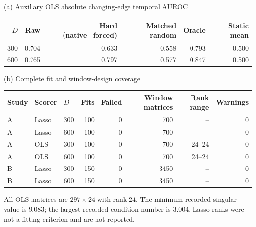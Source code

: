 \begin{minipage}{\linewidth}
\centering\small
(a) Auxiliary OLS absolute changing-edge temporal AUROC\par\medskip
\begin{tabular}{rrrrrr}
\toprule
$D$ & Raw & Hard (native=forced) & Matched random & Oracle & Static mean \\
\midrule
300 & 0.704 & 0.633 & 0.558 & 0.793 & 0.500 \\
600 & 0.765 & 0.797 & 0.577 & 0.847 & 0.500 \\
\bottomrule
\end{tabular}
\par\bigskip
(b) Complete fit and window-design coverage\par\medskip
\begin{tabular}{lllrrrrr}
\toprule
Study & Scorer & $D$ & Fits & Failed & Window matrices & Rank range & Warnings \\
\midrule
A & Lasso & 300 & 100 & 0 & 700 & -- & 0 \\
A & Lasso & 600 & 100 & 0 & 700 & -- & 0 \\
A & OLS & 300 & 100 & 0 & 700 & 24--24 & 0 \\
A & OLS & 600 & 100 & 0 & 700 & 24--24 & 0 \\
B & Lasso & 300 & 150 & 0 & 3450 & -- & 0 \\
B & Lasso & 600 & 150 & 0 & 3450 & -- & 0 \\
\bottomrule
\end{tabular}
\par\medskip\raggedright\small
All OLS matrices are $297\times24$ with rank $24$. The minimum recorded singular value is $9.083$; the largest recorded condition number is $3.004$. Lasso ranks were not a fitting criterion and are not reported.
\end{minipage}
